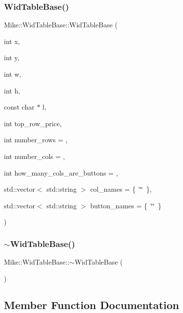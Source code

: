 \subsubsection{\texorpdfstring{Wid\+Table\+Base()}{WidTableBase()}\hspace{0.1cm}{\footnotesize\ttfamily [2/2]}}
{\footnotesize\ttfamily Mike\+::\+Wid\+Table\+Base\+::\+Wid\+Table\+Base (\begin{DoxyParamCaption}\item[{int}]{x,  }\item[{int}]{y,  }\item[{int}]{w,  }\item[{int}]{h,  }\item[{const char $\ast$}]{l,  }\item[{int}]{top\+\_\+row\+\_\+price,  }\item[{int}]{number\+\_\+rows = {},  }\item[{int}]{number\+\_\+cols = {},  }\item[{int}]{how\+\_\+many\+\_\+cols\+\_\+are\+\_\+buttons = {},  }\item[{std\+::vector$<$ std\+::string $>$}]{col\+\_\+names = {\ttfamily \{~\char`\"{}\char`\"{}~\}},  }\item[{std\+::vector$<$ std\+::string $>$}]{button\+\_\+names = {\ttfamily \{~\char`\"{}\char`\"{}~\}} }\end{DoxyParamCaption})\hspace{0.3cm}{\ttfamily [protected]}}

\mbox{\label{class_mike_1_1_wid_table_base_a66c2828fd13a8abf4f5faa274e632542}} 
\subsubsection{\texorpdfstring{$\sim$\+Wid\+Table\+Base()}{~WidTableBase()}}
{\footnotesize\ttfamily Mike\+::\+Wid\+Table\+Base\+::$\sim$\+Wid\+Table\+Base (\begin{DoxyParamCaption}{ }\end{DoxyParamCaption})\hspace{0.3cm}{\ttfamily [protected]}}



\subsection{Member Function Documentation}
\mbox{\label{class_mike_1_1_wid_table_base_afba70372ad656f248ca4ea9dc408e41f}} 

